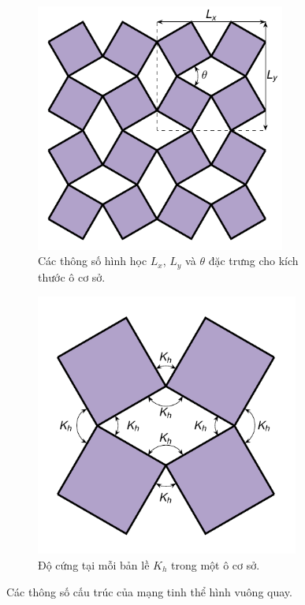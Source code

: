 \begin{figure}[!h]
    \centering
    \begin{subfigure}{0.45\textwidth}
        \centering
        \includegraphics[width=0.9\textwidth]{Problem_1/Figs_P1/Parameters_rotating_squares.pdf}
        \caption{Các thông số hình học \(L_x\), \(L_y\) và \(\theta\) đặc trưng cho kích thước ô cơ sở.}
        \label{fig:Parameters_rotating_squares}
    \end{subfigure}
    \hspace{0.05\textwidth}
    \begin{subfigure}{0.45\textwidth}
        \centering
        \includegraphics[width=0.95\textwidth]{Problem_1/Figs_P1/Stiffness.pdf}
        \caption{Độ cứng tại mỗi bản lề \(K_h\) trong một ô cơ sở.}
        \label{fig:Stiffness}
    \end{subfigure}
    \caption{Các thông số cấu trúc của mạng tinh thể hình vuông quay.}
\end{figure}

